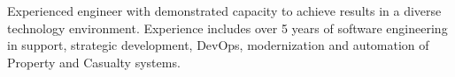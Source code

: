 


\begin{cvparagraph}

Experienced engineer with demonstrated capacity to achieve results in a diverse 
technology environment.  Experience includes over 5 years of software engineering 
in support, strategic development, DevOps,  modernization and automation of 
Property and Casualty systems. 

\end{cvparagraph}
